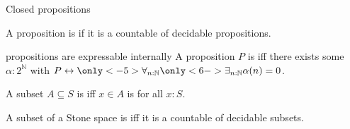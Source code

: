 \documentclass{beamer}
\begin{document}
\begin{frame}{Closed propositions}
\begin{definition}
  A proposition is  if it is a countable 
   of decidable propositions. 
\end{definition}
\pause 
\begin{block}{
   
  propositions are expressable internally}
  A proposition $P$ is 
  iff \pause there exists some $\alpha:2^\mathbb N$ with 
  $P\leftrightarrow \only<-5>{\forall_{n:\mathbb N}}\only<6->{\exists_{n:\mathbb N}}\alpha(n) = 0$.
\end{block}
\pause
\begin{definition}
  A subset $A\subseteq S$ is 
  \only<-5>{closed} \only<6->{open}
  iff $x\in A$ is 
  for all $x:S$. 
\end{definition}
\pause
\begin{lemma}
  A subset of a Stone space is 
   
  iff 
  it is a countable  of decidable subsets.
\end{lemma}
\end{frame}
\end{document}

